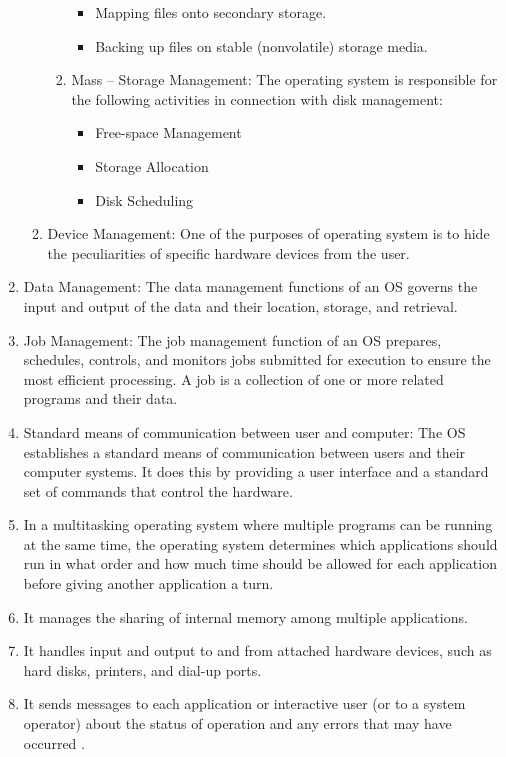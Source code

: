 \documentclass[11pt,a4paper]{article}
\begin{document}
\begin{enumerate}
\begin{enumerate}
\begin{enumerate}
\begin{itemize}
		\item Mapping files onto secondary storage.
		\item Backing up files on stable (nonvolatile) storage media.
		\end{itemize}
		\item Mass – Storage Management:  The operating system is responsible for the following activities in connection with disk management:
		\begin{itemize}
		\item Free-space Management
		\item Storage Allocation
		\item Disk Scheduling
		\end{itemize}
		
		\end{enumerate}
		\item Device Management:  One of the purposes of operating system is to hide the peculiarities of specific hardware devices from the user. 
		\end{enumerate}
		\item Data Management:  The data management functions of an OS governs the input and output of the data and their location, storage, and retrieval.
		\item Job Management:  The job management function of an OS prepares, schedules, controls, and monitors jobs submitted for execution to ensure the most efficient processing. A job is a collection of one or more related programs and their data.
		\item Standard means of communication between user and computer:  The OS establishes a standard means of communication between users and their computer systems. It does this by providing a user interface and a standard set of commands that control the hardware. 
		\item In a multitasking operating system where multiple programs can be running at the same time, the operating system determines which applications should run in what order and how much time should be allowed for each application before giving another application a turn.
		\item It manages the sharing of internal memory among multiple applications.
		\item It handles input and output to and from attached hardware devices, such as hard disks, printers, and dial-up ports.
		\item It sends messages to each application or interactive user (or to a system operator) about the status of operation and any errors that may have occurred .

\end{enumerate}
\end{document}
